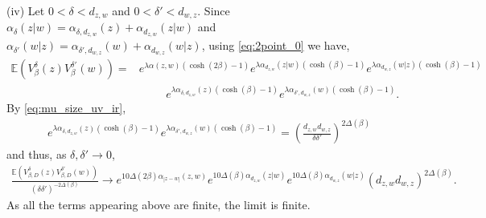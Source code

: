 \documentclass[a4paper, 11pt, reqno]{amsart}
\theoremstyle{definition} \newtheorem{defn}{Definition}[section]
\theoremstyle{remark} \newtheorem{rem}[defn]{Remark}
\theoremstyle{remark} \newtheorem*{rem*}{Remark}
\theoremstyle{plain} \newtheorem{thm}[defn]{Theorem}
\theoremstyle{plain} \newtheorem{lem}[defn]{Lemma}
\theoremstyle{plain} \newtheorem{prop}[defn]{Proposition}
\theoremstyle{plain} \newtheorem{cor}[defn]{Corollary}
\theoremstyle{remark} \newtheorem{exm}[defn]{\textbf{Example}}
\theoremstyle{remark} \newtheorem{exms}[defn]{\textbf{Examples}}
\theoremstyle{remark} \newtheorem*{bl}{}
\numberwithin{equation}{section} %
\newcommand{\C}{\mathbb{C}}
\newcommand{\E}{\mathbb{E}}
\begin{document}
        (iv) Let $0<\delta < d_{z,w}$ and $0<\delta' <d_{w,z}$. Since $\alpha_{\delta} (z|w) = \alpha_{\delta, d_{z,w}}(z) + \alpha_{d_{z,w}}(z|w)$ and $
        \alpha_{\delta'} (w|z) = \alpha_{\delta', d_{w,z}}(w) + \alpha_{d_{w,z}}(w|z)$, using \eqref{eq:2point_0} we have,
		\begin{align}
			  \E \left( V^{\delta}_{\beta}(z) V^{\delta'}_{\beta}(w)\right) 
			= & e^{ \lambda \alpha(z,w) \left(\cosh(2\beta)-1\right)}   e^{ \lambda\alpha_{d_{z,w}}(z|w)(\cosh(\beta) -1)}
            e^{\lambda\alpha_{d_{w,z}}(w|z)(\cosh(\beta) -1) }
			\nonumber 
            \\
			& \hspace{1cm} e^{\lambda  \alpha_{\delta,d_{z,w}}(z)(\cosh(\beta) -1)} e^{\lambda \alpha_{\delta' ,d_{w,z}}(w)(\cosh(\beta) -1)} .	
		\end{align}
		By \eqref{eq:mu_size_uv_ir}, 
        \begin{align}
            e^{\lambda  \alpha_{\delta,d_{z,w}}(z)(\cosh(\beta) -1)} e^{\lambda \alpha_{\delta' ,d_{w,z}}(w)(\cosh(\beta) -1)} = \left(\frac{d_{z,w}d_{w,z}}{\delta \delta'}\right)^{2 \Delta (\beta)} 
        \end{align} and thus, as $\delta, \delta' \to 0$, 
		\begin{align}
			 \frac{\E( V^{\delta}_{\beta, D}(z) V^{\delta'}_{\beta, D}(w))}{(\delta \delta') ^{ -2\Delta(\beta)}} 
			\to  e^{10 \Delta(2\beta)  \alpha_{|z-w|}(z,w)}  
            e^{ 10 \Delta(\beta)\alpha_{d_{z,w}}(z|w)} 
            e^{10 \Delta(\beta) \alpha_{d_{w,z}}(w|z) } (d_{z,w}d_{w,z})^{2 \Delta(\beta)}.
		\end{align}			
        As all the terms appearing above are finite, the limit is finite.
\end{document}
